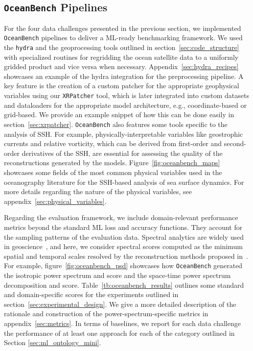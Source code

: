 \subsection{\texttt{OceanBench} Pipelines}

For the four data challenges presented in the previous section, we implemented \texttt{OceanBench} pipelines to deliver a ML-ready benchmarking framework.
We used the \texttt{hydra} and the geoprocessing tools outlined in section~\ref{sec:code_structure} with specialized routines for regridding the ocean satellite data to a uniformly gridded product and vice versa when necessary. 
Appendix~\ref{sec:hydra_recipes} showcases an example of the hydra integration for the preprocessing pipeline. 
A key feature is the creation of a custom patcher for the appropriate geophysical variables using our \texttt{XRPatcher} tool, which is later integrated into custom datasets and dataloaders for the appropriate model architecture, e.g., coordinate-based or grid-based. 
We provide an example snippet of how this can be done easily in section~\ref{sec:xrpatcher}.
\texttt{OceanBench} also features some tools specific to the analysis of SSH. 
For example, physically-interpretable variables like geostrophic currents and relative vorticity, which can be derived from first-order and second-order derivatives of the SSH, are essential for assessing the quality of the reconstructions generated by the models. 
Figure~\ref{fig:oceanbench_maps} showcases some fields of the most common physical variables used in the oceanography literature for the SSH-based analysis of sea surface dynamics. For more details regarding the nature of the physical variables, see appendix~\ref{sec:physical_variables}.

Regarding the evaluation framework, we include domain-relevant performance metrics beyond the standard ML loss and accuracy functions. They account for the sampling patterns of the evaluation data. Spectral analytics are widely used in geoscience~\cite{BFNQG}, and here, we consider spectral scores computed as the minimum spatial and temporal scales resolved by the reconstruction methods proposed in~\cite{BFNQG}.
For example, figure~\ref{fig:oceanbench_psd} showcases how \texttt{OceanBench} generated the isotropic power spectrum and score and the space-time power spectrum decomposition and score.
Table~\ref{tb:oceanbench_results} outlines some standard and domain-specific scores for the experiments outlined in section~\ref{sec:experimental_design}.
We give a more detailed description of the rationale and construction of the power-spectrum-specific metrics in appendix~\ref{sec:metrics}. In terms of baselines, we report for each data challenge the performance of at least one approach for each of the category outlined in Section \ref{sec:ml_ontology_mini}.


